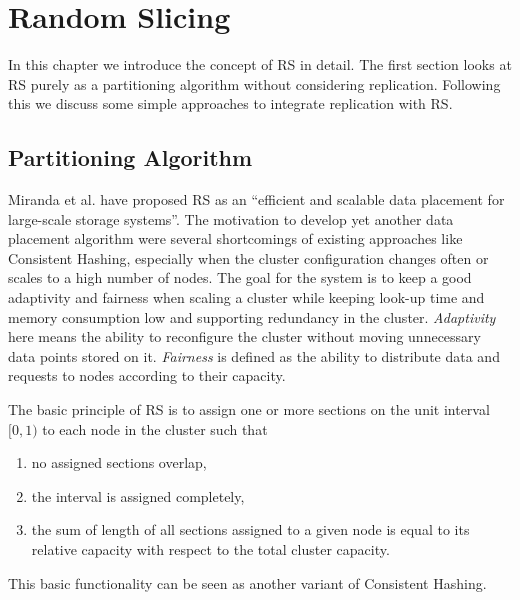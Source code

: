 
\chapter{Random Slicing}
\label{ch:random_slicing}
In this chapter we introduce the concept of \ac{RS} in detail.
The first section looks at \ac{RS} purely as a partitioning algorithm without considering replication.
Following this we discuss some simple approaches to integrate replication with \ac{RS}.

\section{Partitioning Algorithm}
\label{sec:partitioning_algorithm}
Miranda et al. have proposed \ac{RS}\cite{Miranda2014} as an ``efficient and scalable data placement for large-scale storage systems''.
The motivation to develop yet another data placement algorithm were several shortcomings of existing approaches like Consistent Hashing, especially when the cluster configuration changes often or scales to a high number of nodes.
The goal for the system is to keep a good adaptivity and fairness when scaling a cluster while keeping look-up time and memory consumption low and supporting redundancy in the cluster.
\emph{Adaptivity} here means the ability to reconfigure the cluster without moving unnecessary data points stored on it.
\emph{Fairness} is defined as the ability to distribute data and requests to nodes according to their capacity.

The basic principle of \ac{RS} is to assign one or more sections on the unit interval $[0,1)$ to each node in the cluster such that
\begin{enumerate}
	\item no assigned sections overlap,
	\item the interval is assigned completely,
	\item the sum of length of all sections assigned to a given node is equal to its relative capacity with respect to the total cluster capacity.
\end{enumerate}
This basic functionality can be seen as another variant of Consistent Hashing\cite{Fritchie2018}.

